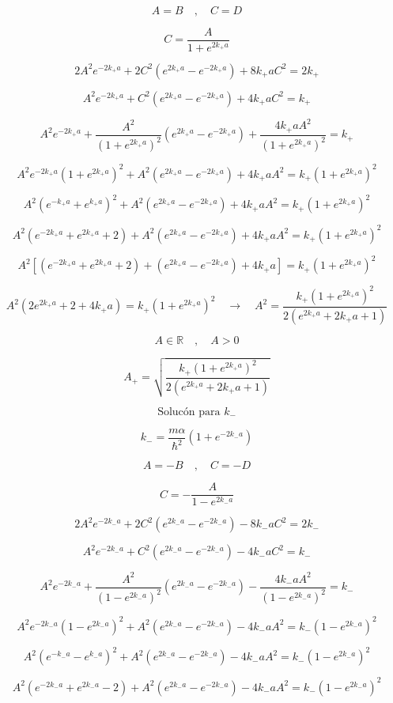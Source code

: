 \documentclass[10pt,a4papper]{article}
\begin{document}
\[A=B\quad,\quad C=D\]

\[C=\frac{A}{1+e^{2k_+ a}}\]

\[2A^2e^{-2k_+ a}+2C^2\left(e^{2k_+ a}-e^{-2k_+ a}\right)+8k_+ aC^2=2k_+\]

\[A^2e^{-2k_+ a}+C^2\left(e^{2k_+ a}-e^{-2k_+ a}\right)+4k_+ aC^2=k_+\]

\[A^2e^{-2k_+ a}+\frac{A^2}{(1+e^{2k_+ a})^2}\left(e^{2k_+ a}-e^{-2k_+ a}\right)+\frac{4k_+ aA^2}{(1+e^{2k_+ a})^2}=k_+\]

\[A^2e^{-2k_+ a}(1+e^{2k_+ a})^2+A^2\left(e^{2k_+ a}-e^{-2k_+ a}\right)+4k_+ aA^2=k_+(1+e^{2k_+ a})^2\]

\[A^2(e^{-k_+ a}+e^{k_+ a})^2+A^2\left(e^{2k_+ a}-e^{-2k_+ a}\right)+4k_+ aA^2=k_+(1+e^{2k_+ a})^2\]

\[A^2(e^{-2k_+ a}+e^{2k_+ a}+2)+A^2\left(e^{2k_+ a}-e^{-2k_+ a}\right)+4k_+ aA^2=k_+(1+e^{2k_+ a})^2\]

\[A^2\left[(e^{-2k_+ a}+e^{2k_+ a}+2)+\left(e^{2k_+ a}-e^{-2k_+ a}\right)+4k_+ a\right]=k_+(1+e^{2k_+ a})^2\]

\[A^2\left(2e^{2k_+ a}+2+4k_+ a\right)=k_+(1+e^{2k_+ a})^2\quad\to\quad
A^2=\frac{k_+(1+e^{2k_+ a})^2}{2\left(e^{2k_+ a}+2k_+ a+1\right)}\]

\[A\in\mathbb{R}\quad,\quad A>0\]

\[\boxed{A_+=\sqrt{\frac{k_+(1+e^{2k_+ a})^2}{2\left(e^{2k_+ a}+2k_+ a+1\right)}}}\]

\newpage
\[\text{Solucón para }k_-\]

\[k_-=\frac{m\alpha}{\hbar^2}\left(1+e^{-2k_- a}\right)\]

\[A=-B\quad,\quad C=-D\]

\[C=-\frac{A}{1-e^{2k_- a}}\]

\[2A^2e^{-2k_- a}+2C^2\left(e^{2k_- a}-e^{-2k_- a}\right)-8k_- aC^2=2k_-\]

\[A^2e^{-2k_- a}+C^2\left(e^{2k_- a}-e^{-2k_- a}\right)-4k_- aC^2=k_-\]

\[A^2e^{-2k_- a}+\frac{A^2}{(1-e^{2k_- a})^2}\left(e^{2k_- a}-e^{-2k_- a}\right)-\frac{4k_- aA^2}{(1-e^{2k_- a})^2}=k_-\]

\[A^2e^{-2k_- a}(1-e^{2k_- a})^2+A^2\left(e^{2k_- a}-e^{-2k_- a}\right)-4k_- aA^2=k_-(1-e^{2k_- a})^2\]

\[A^2(e^{-k_- a}-e^{k_- a})^2+A^2\left(e^{2k_- a}-e^{-2k_- a}\right)-4k_- aA^2=k_-(1-e^{2k_- a})^2\]

\[A^2(e^{-2k_- a}+e^{2k_- a}-2)+A^2\left(e^{2k_- a}-e^{-2k_- a}\right)-4k_- aA^2=k_-(1-e^{2k_- a})^2\]
\end{document}
